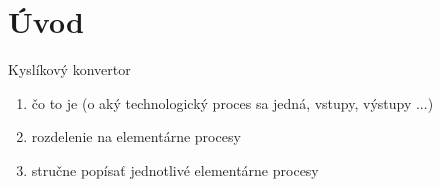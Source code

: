 \setcounter{page}{1}
\setcounter{equation}{0}
\setcounter{figure}{0}
\setcounter{table}{0}

\section*{Úvod}

Kyslíkový konvertor
\begin{enumerate}
	\item{čo to je (o aký technologický proces sa jedná, vstupy, výstupy ...)}
	\item{rozdelenie na elementárne procesy}
	\item{stručne popísať jednotlivé elementárne procesy}
\end{enumerate}
